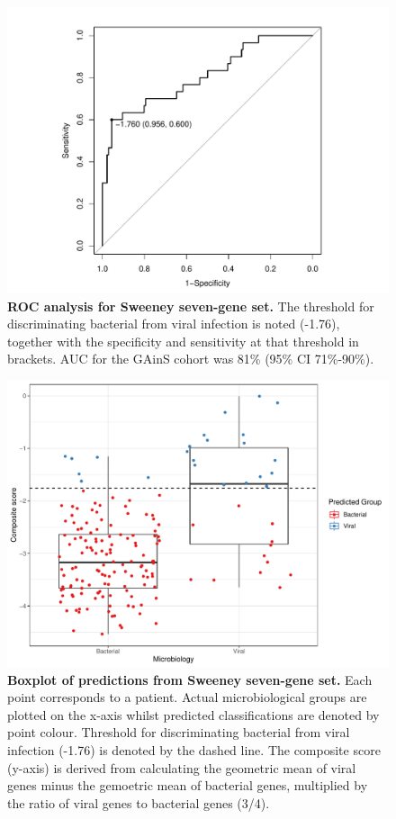\FloatBarrier
\begin{figure}[htbp]
\centering
\includegraphics[scale=0.6]{./Results3/Images/Sweeney-ROC.pdf}
\caption[ROC analysis for Sweeney seven-gene set]{\textbf{ROC analysis for Sweeney seven-gene set.} The threshold for discriminating bacterial from viral infection is noted (-1.76), together with the specificity and sensitivity at that threshold in brackets. AUC for the GAinS cohort was 81\% (95\% CI 71\%-90\%).}
\label{fig:roc-sweeney}
\end{figure}


\begin{figure}[htbp]
\centering
\includegraphics[scale=0.5]{./Results3/Images/Sweeney-boxplot.pdf}
\caption[Boxplot for Sweeney seven-gene set]{\textbf{Boxplot of predictions from Sweeney seven-gene set.} Each point corresponds to a patient. Actual microbiological groups are plotted on the x-axis whilst predicted classifications are denoted by point colour. Threshold for discriminating bacterial from viral infection (-1.76) is denoted by the dashed line. The composite score (y-axis) is derived from calculating the geometric mean of viral genes minus the gemoetric mean of bacterial genes, multiplied by the ratio of viral genes to bacterial genes (3/4).}
\label{fig:boxplot-sweeney}
\end{figure}
\FloatBarrier

